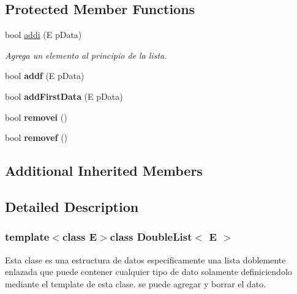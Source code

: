 \subsection*{Protected Member Functions}
\begin{DoxyCompactItemize}
\item 
bool \hyperlink{class_double_list_a01623cc4b04d94c655de62ae373963b2}{addi} (E p\-Data)
\begin{DoxyCompactList}\small\item\em Agrega un elemento al principio de la lista. \end{DoxyCompactList}\item 
\hypertarget{class_double_list_a495cbf66dc7f7523e15405b762cc616d}{bool {\bfseries addf} (E p\-Data)}\label{class_double_list_a495cbf66dc7f7523e15405b762cc616d}

\item 
\hypertarget{class_double_list_a4d72bc061da9183185b9ae1896b2767b}{bool {\bfseries add\-First\-Data} (E p\-Data)}\label{class_double_list_a4d72bc061da9183185b9ae1896b2767b}

\item 
\hypertarget{class_double_list_a074473aaac863a9e00ec34c2316a2d9e}{bool {\bfseries removei} ()}\label{class_double_list_a074473aaac863a9e00ec34c2316a2d9e}

\item 
\hypertarget{class_double_list_a0cd7c06fa533e3f800778920346b8a7b}{bool {\bfseries removef} ()}\label{class_double_list_a0cd7c06fa533e3f800778920346b8a7b}

\end{DoxyCompactItemize}
\subsection*{Additional Inherited Members}


\subsection{Detailed Description}
\subsubsection*{template$<$class E$>$class Double\-List$<$ E $>$}

Esta clase es una estructura de datos especificamente una lista doblemente enlazada que puede contener cualquier tipo de dato solamente definiciendolo mediante el template de esta clase. se puede agregar y borrar el dato. 

